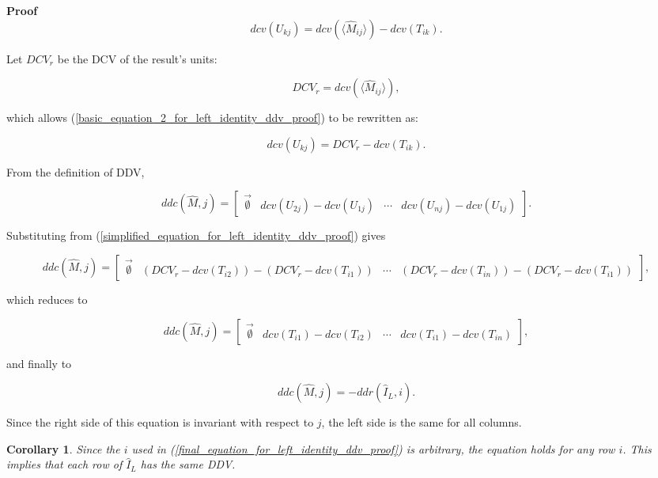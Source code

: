 \documentclass[10pt,letterpaper]{article}
\newtheorem{cor}{Corollary}[section]
\newenvironment{proof}{\noindent\textbf{Proof} }{\qed \newline}
\newcommand{\qed}{\nobreak \ifvmode \relax \else
      \ifdim\lastskip<1.5em \hskip-\lastskip
      \hskip1.5em plus0em minus0.5em \fi \nobreak
      \vrule height0.75em width0.5em depth0.25em\fi}
\numberwithin{equation}{section}
\begin{document}
\begin{proof}
\begin{equation} \label{basic_equation_2_for_left_identity_ddv_proof} dcv(U_{kj}) = dcv( \langle \hat M_{ij} \rangle ) - dcv(T_{ik}) . \end{equation}

Let $DCV_r$ be the DCV of the result's units:

\[ DCV_r = dcv( \langle \hat M_{ij} \rangle ) , \]

which allows (\ref{basic_equation_2_for_left_identity_ddv_proof}) to be rewritten as:

\begin{equation} \label{simplified_equation_for_left_identity_ddv_proof} dcv(U_{kj}) = DCV_r - dcv(T_{ik}) . \end{equation}

From the definition of DDV,

\[ ddc(\hat M, j) = \left[ \begin{matrix} \vec{\emptyset} & dcv(U_{2j}) - dcv(U_{1j}) & \cdots & dcv(U_{nj}) - dcv(U_{1j}) \end{matrix} \right] . \]

Substituting from (\ref{simplified_equation_for_left_identity_ddv_proof}) gives

\[ ddc(\hat M, j) = \left[ \begin{matrix} \vec{\emptyset} & (DCV_r - dcv(T_{i2})) - (DCV_r - dcv(T_{i1})) & \cdots & (DCV_r - dcv(T_{in})) - (DCV_r - dcv(T_{i1})) \end{matrix} \right] , \]

which reduces to

\[ ddc(\hat M, j) = \left[ \begin{matrix} \vec{\emptyset} & dcv(T_{i1}) - dcv(T_{i2}) & \cdots & dcv(T_{i1}) - dcv(T_{in}) \end{matrix} \right] , \]

and finally to

\begin{equation} \label{final_equation_for_left_identity_ddv_proof} ddc(\hat M, j) = -ddr(\hat I_L, i) . \end{equation} 

Since the right side of this equation is invariant with respect to $j$, the left side is the same for all columns. \end{proof}

\begin{cor}Since the $i$ used in (\ref{final_equation_for_left_identity_ddv_proof}) is arbitrary, the equation holds for any row $i$.  This implies that each row of $\hat I_L$ has the same DDV.\end{cor}
\end{document}
